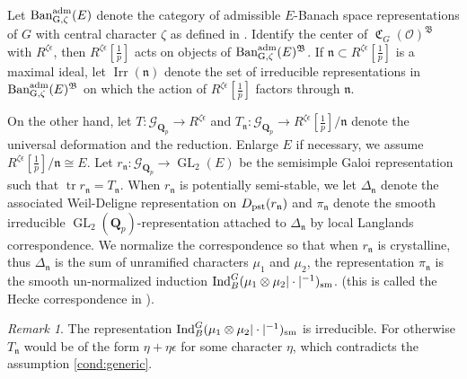 \documentclass[leqno]{amsart}
\theoremstyle{definition}
\theoremstyle{remark}
\newtheorem{rem}[thm]{Remark}
\newcommand{\oo}{\mathcal{O}}
\newcommand{\Qp}{\mathbf{Q}_p}
\DeclareMathOperator{\Ind}{Ind}
\DeclareMathOperator{\GL}{GL}
\DeclareMathOperator{\mtr}{tr}
\newcommand{\pst}{\textnormal{pst}}
\newcommand{\fn}{\mathfrak{n}}
\DeclareMathOperator{\fC}{\mathfrak{C}} %
\DeclareMathOperator{\Ban}{\textnormal{Ban}_{G,\zeta}^{\adm}}
\DeclareMathOperator{\Irr}{Irr}
\newcommand{\Gp}{\mathcal{G}_{\Qp}} %
\newcommand{\B}{\mathfrak B} %
\newcommand{\sm}{\textnormal{sm}}
\newcommand{\adm}{\textnormal{adm}}
\begin{document}
Let $\Ban(E)$
denote the category of admissible $E$-Banach space
representations of $G$ with central character $\zeta$
as defined in \cite{pask}.
Identify the center of $\fC_G(\oo)^\B$ with $R^{\zeta\epsilon}$,
then $R^{\zeta\epsilon}[\frac{1}{p}]$ acts on objects of $\Ban(E)^{\B}$.
If $\fn\subset R^{\zeta\epsilon}[\frac{1}{p}]$ 
is a maximal ideal,
let $\Irr(\fn)$ denote the set of
irreducible representations in  $\Ban(E)^{\B}$
on which the action of $R^{\zeta\epsilon}[\frac{1}{p}]$ 
factors through $\fn$.

On the other hand,
let $T\colon \Gp\to R^{\zeta\epsilon}$ 
and $T_\fn\colon \Gp\to R^{\zeta\epsilon}[\frac{1}{p}]/\fn$ 
denote the universal deformation and 
the reduction.
Enlarge $E$ if necessary,
we assume $R^{\zeta\epsilon}[\frac{1}{p}]/\fn\cong E$.
Let $r_{\fn}\colon \Gp\to \GL_2(E)$
be the semisimple Galoi representation
such that $\mtr r_{\fn}=T_{\fn}$.
When $r_\fn$ is potentially semi-stable,
we let $\Delta_{\fn}$ denote
the associated Weil-Deligne representation 
on $D_{\pst}(r_\fn)$
and $\pi_{\fn}$ denote the smooth irreducible
$\GL_2(\Qp)$-representation attached to $\Delta_{\fn}$
by local Langlands correspondence.
We normalize the correspondence so that 
when $r_{\fn}$ is crystalline, 
thus $\Delta_{\fn}$
is the sum of unramified characters $\mu_1$ and $\mu_2$,
the representation $\pi_\fn$ 
is the smooth un-normalized induction
$\Ind_B^G(\mu_1\otimes\mu_2|\cdot|^{-1})_{\sm}$.
(this is called the Hecke correspondence in \cite{pan}).

\begin{rem}
	The representation 
	$\Ind_B^G(\mu_1\otimes\mu_2|\cdot|^{-1})_{\sm}$
	is irreducible.
	For otherwise
	$T_\fn$ would be of the form
	$\eta+\eta\epsilon$ for some character  $\eta$,
    which contradicts 
    the assumption \eqref{cond:generic}.
\end{rem}
\end{document}
